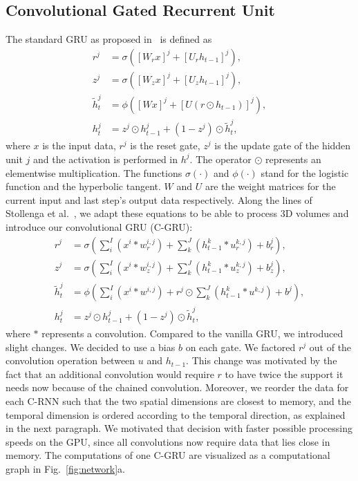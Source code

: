 \documentclass[runningheads,a4paper]{llncs}
\begin{document}
\subsection{Convolutional Gated Recurrent Unit}\label{reordering}


The standard GRU as proposed in~\cite{cho_learning_2014} is defined as
\begin{align}
 r^j &= \sigma([W_r x]^j + [U_r h_{t-1}]^j),\\
 z^j &= \sigma([W_z x]^j + [U_z h_{t-1}]^j),\\
 \tilde{h}^j_t &= \phi([Wx]^j + [U(r \odot h_{t-1})]^j),\\
 h^j_{t} &= z^j\odot h^j_{t-1} + (1-z^j)\odot \tilde{h}^j_{t},
\end{align}
where $x$ is the input data, $r^j$ is the reset gate, $z^j$ is the update gate of the hidden unit $j$ and the activation is performed in $h^j$. The operator $\odot$ represents an elementwise multiplication. The functions $\sigma(\cdot)$ and $\phi(\cdot)$ stand for the logistic function and the hyperbolic tangent. $W$ and $U$ are the weight matrices for the current input and last step's output data respectively. Along the lines of Stollenga et al.~\cite{stollenga_parallel_2015}, we adapt these equations to be able to process 3D volumes and introduce our convolutional GRU (C-GRU):
\begin{align}\label{eq:cgru1}
 r^j &= \sigma \left( \sum\limits_i^I (x^i*w_r^{i,j}) + \sum\limits_k^J ( h_{t-1}^k*u_r^{k,j} ) +b^j_r\right),\\\label{eq:cgru2}
 z^j &= \sigma \left( \sum\limits_i^I (x^i*w_z^{i,j}) + \sum\limits_k^J ( h_{t-1}^k*u_z^{k,j} ) +b^j_z\right),\\\label{eq:cgru3}
 \tilde{h}^j_t &= \phi \left( \sum\limits_i^I (x^i*w^{i,j}) + r^j \odot \sum\limits_k^J ( h_{t-1}^k * u^{k,j} ) +b^j\right),\\
  h^j_{t} &= z^j\odot h^j_{t-1} + (1-z^j)\odot\tilde{h}^j_{t},
\end{align}
where $*$ represents a convolution. Compared to the vanilla GRU, we introduced slight changes. We decided to use a bias $b$ on each gate. We factored $r^j$ out of the convolution operation between $u$ and $h_{t-1}$. This change was motivated by the fact that an additional convolution would require $r$ to have twice the support it needs now because of the chained convolution. Moreover, we reorder the data for each C-RNN such that the two spatial dimensions are closest to memory, and the temporal dimension is ordered according to the temporal direction, as explained in the next paragraph. We motivated that decision with faster possible processing speeds on the GPU, since all convolutions now require data that lies close in memory. The computations of one C-GRU are visualized as a computational graph in Fig.~\ref{fig:network}a.
\end{document}
